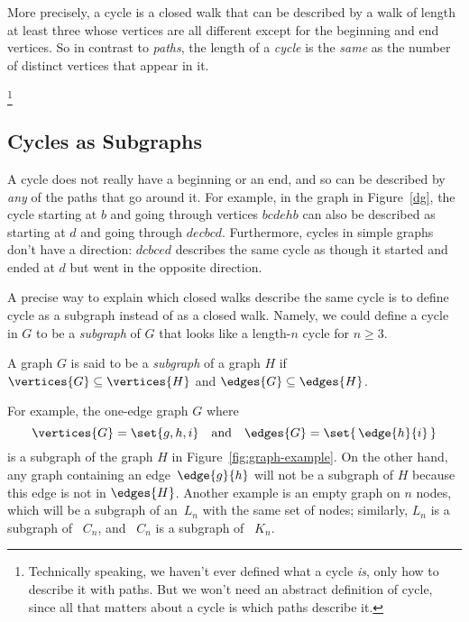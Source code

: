 More precisely, a cycle is a
closed walk that can be described by a walk of length at least three whose
vertices are all different except for the beginning and end vertices.
So in contrast to \emph{paths}, the length of a \emph{cycle} is the
\emph{same} as the number of distinct vertices that appear in it.

\footnote{Technically speaking, we haven't ever defined what a cycle
\emph{is}, only how to describe it with paths.  But we won't need an
abstract definition of cycle, since all that matters about a cycle is which
paths describe it.}
\fi

\subsection{Cycles as Subgraphs}

A cycle does not really have a beginning or an end, and so can be
described by \emph{any} of the paths that go around it.  For example,
in the graph in Figure~\ref{dg}, the cycle starting at $b$ and going
through vertices $bcdehb$ can also be described as starting at $d$ and
going through $decbcd$.  Furthermore, cycles in simple graphs don't
have a direction: $dcbced$ describes the same cycle as though it
started and ended at $d$ but went in the opposite direction.

A precise way to explain which closed walks describe the same cycle is
to define cycle as a subgraph instead of as a closed walk.  Namely, we
could define a cycle in $G$ to be a \emph{subgraph} of $G$ that looks
like a length-$n$ cycle for $n \ge 3$.

\begin{definition}\label{def:subgraph}
  A graph $G$ is said to be a \emph{subgraph} of a graph $H$ if
  $\vertices{G} \subseteq \vertices{H}$ and $\edges{G} \subseteq
  \edges{H}$.
\end{definition}

For example, the one-edge graph $G$ where
\begin{equation*}
   \vertices{G} = \set{ g, h, i } \quad \text{and}\quad  \edges{G} =
   \set{\, \edge{h}{i} \, }
\end{equation*}
is a subgraph of the graph $H$ in Figure~\ref{fig:graph-example}.  On the
other hand, any graph containing an edge~$\edge{g}{h}$ will not be a
subgraph of $H$ because this edge is not in $\edges{H}$.  Another example
is an empty graph on $n$ nodes, which will be a subgraph of an~$L_n$ with
the same set of nodes; similarly, $L_n$ is a subgraph of ~$C_n$, and ~$C_n$ is
a subgraph of ~$K_n$.

